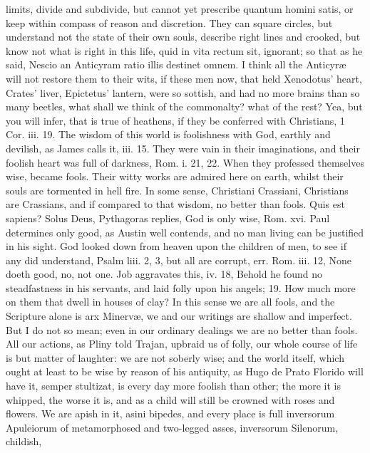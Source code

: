 {limits, divide and subdivide, but cannot yet prescribe quantum homini
satis, or keep within compass of reason and discretion. They can square
circles, but understand not the state of their own souls, describe
right lines and crooked, \etc but know not what is right in this life,
quid in vita rectum sit, ignorant; so that as he said, Nescio an
Anticyram ratio illis destinet omnem. I think all the Anticyr\ae{} will
not restore them to their wits, if these men now, that held 
Xenodotus' heart, Crates' liver, Epictetus' lantern, were so sottish,
and had no more brains than so many beetles, what shall we think of the
commonalty? what of the rest?
Yea, but you will infer, that is true of heathens, if they be conferred
with Christians, 1 Cor. iii. 19. The wisdom of this world is
foolishness with God, earthly and devilish, as James calls it, iii. 15.
They were vain in their imaginations, and their foolish heart was full
of darkness, Rom. i. 21, 22. When they professed themselves wise,
became fools. Their witty works are admired here on earth, whilst their
souls are tormented in hell fire. In some sense, Christiani Crassiani,
Christians are Crassians, and if compared to that wisdom, no better
than fools. Quis est sapiens? Solus Deus, Pythagoras replies, God
is only wise, Rom. xvi. Paul determines only good, as Austin well
contends, and no man living can be justified in his sight. God looked
down from heaven upon the children of men, to see if any did
understand, Psalm liii. 2, 3, but all are corrupt, err. Rom. iii. 12,
None doeth good, no, not one. Job aggravates this, iv. 18, Behold he
found no steadfastness in his servants, and laid folly upon his angels;
19. How much more on them that dwell in houses of clay? In this sense
we are all fools, and the Scripture alone is arx Minerv\ae{}, we and
our writings are shallow and imperfect. But I do not so mean; even in
our ordinary dealings we are no better than fools. All our actions, as
Pliny told Trajan, upbraid us of folly, our whole course of life
is but matter of laughter: we are not soberly wise; and the world
itself, which ought at least to be wise by reason of his antiquity, as
Hugo de Prato Florido will have it, semper stultizat, is every day
more foolish than other; the more it is whipped, the worse it is, and
as a child will still be crowned with roses and flowers. We are apish
in it, asini bipedes, and every place is full inversorum Apuleiorum of
metamorphosed and two-legged asses, inversorum Silenorum, childish,
}
